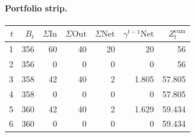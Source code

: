 \documentclass[12pt, a4paper]{article}
\begin{document}
\paragraph{Portfolio strip.}
\begin{center}
\begin{tabular}{rrrrrrr}
\toprule
$t$ & $B_t$ & $\Sigma\mathrm{In}$ & $\Sigma\mathrm{Out}$ & $\Sigma\mathrm{Net}$ & $\gamma^{t-1}\mathrm{Net}$ & $Z_t^{\mathrm{cum}}$\\
\midrule
1 & 356 & 60 & 40 & 20 & 20 & 56 \\
2 & 356 & 0 & 0 & 0 & 0 & 56 \\
3 & 358 & 42 & 40 & 2 & 1.805 & 57.805 \\
4 & 358 & 0 & 0 & 0 & 0 & 57.805 \\
5 & 360 & 42 & 40 & 2 & 1.629 & 59.434 \\
6 & 360 & 0 & 0 & 0 & 0 & 59.434 \\
\bottomrule
\end{tabular}
\end{center}
\end{document}
